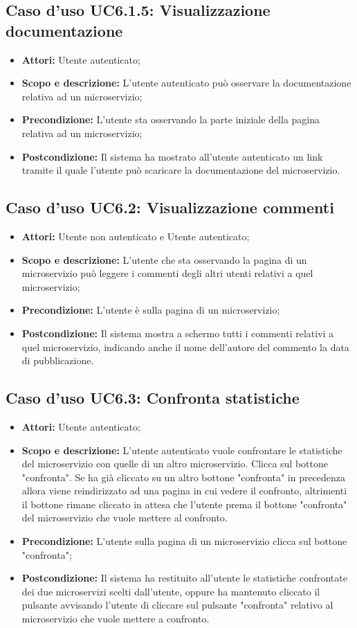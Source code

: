\documentclass[12pt,a4paper,titlepage]{article}
\begin{document}
\subsection{Caso d'uso UC6.1.5: Visualizzazione documentazione}
\begin{itemize}
	\item \textbf{Attori: }Utente autenticato;
	\item \textbf{Scopo e descrizione: }L'utente autenticato può osservare la documentazione relativa ad un microservizio;
	\item \textbf{Precondizione: }L'utente sta osservando la parte iniziale della pagina relativa ad un microservizio;
	\item \textbf{Postcondizione: }Il sistema ha mostrato all'utente autenticato un link tramite il quale l'utente può scaricare la documentazione del microservizio.
\end{itemize}
\subsection{Caso d'uso UC6.2: Visualizzazione commenti}
\begin{itemize}
	\item \textbf{Attori: }Utente non autenticato e Utente autenticato;
	\item \textbf{Scopo e descrizione: }L'utente che sta osservando la pagina di un microservizio può leggere i commenti degli altri utenti relativi a quel microservizio;
	\item \textbf{Precondizione: }L'utente è sulla pagina di un microservizio;
	\item \textbf{Postcondizione: }Il sistema mostra a schermo tutti i commenti relativi a quel microservizio, indicando anche il nome dell'autore del commento la data di pubblicazione.
\end{itemize}
\subsection{Caso d'uso UC6.3: Confronta statistiche}
\begin{itemize}
	\item \textbf{Attori: }Utente autenticato;
	\item \textbf{Scopo e descrizione: }L'utente autenticato vuole confrontare le statistiche del microservizio con quelle di un altro microservizio. Clicca sul bottone "confronta". Se ha già cliccato su un altro bottone "confronta" in precedenza allora viene reindirizzato ad una pagina in cui vedere il confronto, altrimenti il bottone rimane cliccato in attesa che l'utente prema il bottone "confronta" del microservizio che vuole mettere al confronto.
	\item \textbf{Precondizione: }L'utente sulla pagina di un microservizio clicca sul bottone "confronta";
	\item \textbf{Postcondizione: }Il sistema ha restituito all'utente le statistiche confrontate dei due microservizi scelti dall'utente, oppure ha mantenuto cliccato il pulsante avvisando l'utente di cliccare sul pulsante "confronta" relativo al microservizio che vuole mettere a confronto.
\end{itemize}
\end{document}
